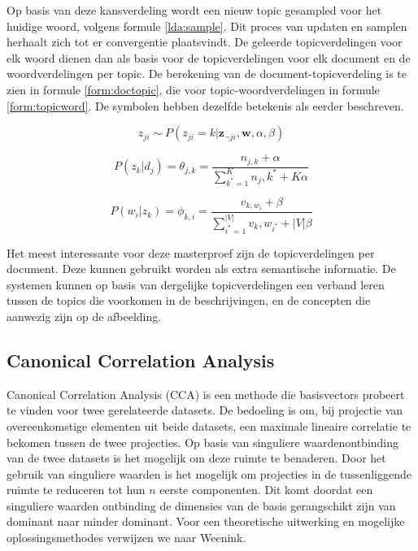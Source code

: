 Op basis van deze kansverdeling wordt een nieuw topic gesampled voor het huidige woord, volgens formule \eqref{lda:sample}. Dit proces van updaten en samplen herhaalt zich tot er convergentie plaatsvindt. De geleerde topicverdelingen voor elk woord dienen dan als basis voor de topicverdelingen voor elk document en de woordverdelingen per topic. De berekening van de document-topicverdeling is te zien in formule \eqref{form:doctopic}, die voor topic-woordverdelingen in formule \eqref{form:topicword}. De symbolen hebben dezelfde betekenis als eerder beschreven.

\begin{equation}
    z_{ji} \sim  P(z_{ji} = k | \mathbf{z}_{\neg ji}, \mathbf{w}, \alpha, \beta)
    \label{lda:sample}
\end{equation}

\begin{equation}
    P(z_k|d_j) = \theta_{j,k} = \frac{n_{j,k} + \alpha}{\sum_{k^*=1}^K n_j,k^* + K\alpha}
    \label{form:doctopic}
\end{equation}

\begin{equation}
    P(w_i|z_k) = \phi_{k,i} = \frac{v_{k,w_i} + \beta}{\sum_{i^*=1}^{|V|} v_k,w_{i^*} + |V|\beta}
    \label{form:topicword}
\end{equation}


Het meest interessante voor deze masterproef zijn de topicverdelingen per document. Deze kunnen gebruikt worden als extra semantische informatie. De systemen kunnen op basis van dergelijke topicverdelingen een verband leren tussen de topics die voorkomen in de beschrijvingen, en de concepten die aanwezig zijn op de afbeelding. 



\subsection{Canonical Correlation Analysis}
\label{sub:stackedcca}
Canonical Correlation Analysis (CCA) is een methode die basisvectors probeert te vinden voor twee gerelateerde datasets. De bedoeling is om, bij projectie van overeenkomstige elementen uit beide datasets, een maximale lineaire correlatie te bekomen tussen de twee projecties. 
Op basis van singuliere waardenontbinding van de twee datasets is het mogelijk om deze ruimte te benaderen. Door het gebruik van singuliere waarden is het mogelijk om projecties in de tussenliggende ruimte te reduceren tot hun $n$ eerste componenten. Dit komt doordat een singuliere waarden ontbinding de dimensies van de basis gerangschikt zijn van dominant naar minder dominant. Voor een theoretische uitwerking en mogelijke oplossingsmethodes verwijzen we naar Weenink\cite{Weenink2003}.

